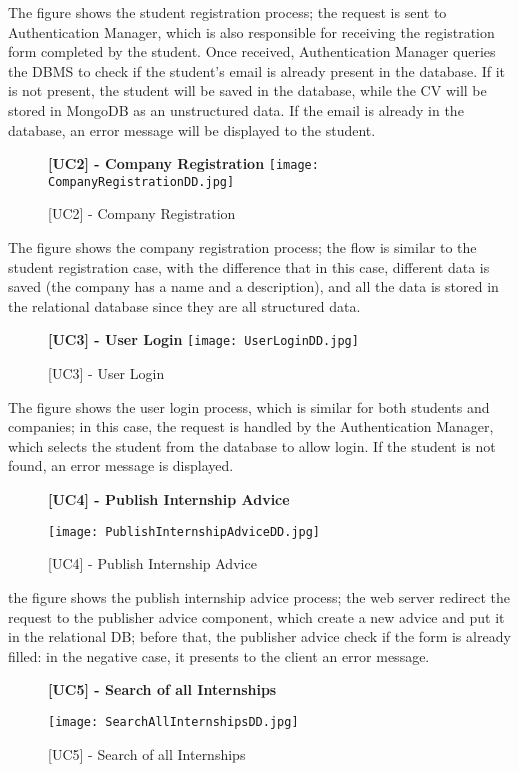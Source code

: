 		The figure shows the student registration process; the request is sent to Authentication Manager, which is also responsible for receiving the registration form completed by the student. Once received, Authentication Manager queries the DBMS to check if the student's email is already present in the database. If it is not present, the student will be saved in the database, while the CV will be stored in MongoDB as an unstructured data. If the email is already in the database, an error message will be displayed to the student.
		
		\begin{figure}[H]
			\centering
			{\bfseries [UC2] - Company Registration}
			\texttt{[image: CompanyRegistrationDD.jpg]}
			\caption{[UC2] - Company Registration}
		\end{figure}
		
		The figure shows the company registration process; the flow is similar to the student registration case, with the difference that in this case, different data is saved (the company has a name and a description), and all the data is stored in the relational database since they are all structured data.
		
		\begin{figure}[H]
			\centering
			{\bfseries [UC3] - User Login}
			\texttt{[image: UserLoginDD.jpg]}
			\caption{[UC3] - User Login}
		\end{figure}
		
		The figure shows the user login process, which is similar for both students and companies; in this case, the request is handled by the Authentication Manager, which selects the student from the database to allow login. If the student is not found, an error message is displayed.
		
		
		\begin{figure}[H]
			\centering
			{\bfseries [UC4] - Publish Internship Advice}
			\caption{[UC4] - Publish Internship Advice}
			\texttt{[image: PublishInternshipAdviceDD.jpg]}
			
		\end{figure}
		
		the figure shows the publish internship advice process; the web server redirect the request to the publisher advice component, which create a new advice and put it in the relational DB; before that, the publisher advice check if the form is already filled: in the negative case, it presents to the client an error message.
		
		
		\begin{figure}[H]
			\centering
			{\bfseries [UC5] - Search of all Internships}
			\caption{[UC5] - Search of all Internships}
			\texttt{[image: SearchAllInternshipsDD.jpg]}
			
		\end{figure}
		

